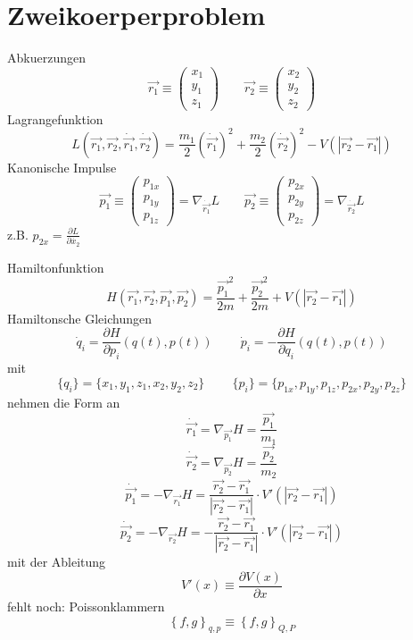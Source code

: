 \documentclass[11pt]{article} %
\begin{document}
\setlength{\parindent}{0ex}


\section{Zweikoerperproblem}

Abkuerzungen
\begin{equation}
\vec{r_1} \equiv \begin{pmatrix} x_1 \\ y_1 \\ z_1 \end{pmatrix}  \quad \quad 
\vec{r_2} \equiv \begin{pmatrix} x_2 \\ y_2 \\ z_2 \end{pmatrix}
\end{equation}
Lagrangefunktion
\[
L(\vec{r_1},\vec{r_2},\dot{\vec{r_1}},\dot{\vec{r_2}}) = 
\frac{m_1}{2}(\dot{\vec{r_1}})^2 +  \frac{m_2}{2}(\dot{\vec{r_2}})^2
- V(\left| \vec{r_2} - \vec{r_1} \right|)
\]
Kanonische Impulse
\[ 
\vec{p_1} \equiv  \begin{pmatrix} p_{1x} \\ p_{1y} \\ p_{1z} \end{pmatrix} = \nabla _{\dot{\vec{r_1}}} L  \quad \quad
\vec{p_2} \equiv  \begin{pmatrix} p_{2x} \\ p_{2y} \\ p_{2z} \end{pmatrix} = \nabla _{\dot{\vec{r_2}}} L 
\]
\centering
z.B.  $ p_{2x} = \frac{\partial L}{\partial \dot{x_2}} $
\par 
\raggedright
Hamiltonfunktion
\[
H(\vec{r_1},\vec{r_2},\vec{p_1},\vec{p_2}) = 
\frac{\vec{p_1}^2}{2m} +  \frac{\vec{p_2}^2}{2m}
+ V(\left| \vec{r_2} - \vec{r_1} \right|)
\]
Hamiltonsche Gleichungen
\[ 
\dot{q}_{i}= \frac{\partial H}{\partial p_{i}}(q(t),p(t))\ \quad \quad 
\dot{p}_{i}=-\frac{\partial H}{\partial q_{i}}(q(t),p(t)) 
\] 
mit
\[ \{q_i\} = \{ x_1, y_1, z_1, x_2, y_2, z_2 \} \  \quad \quad \{p_i\} = \{ p_{1x}, p_{1y}, p_{1z}, p_{2x}, p_{2y}, p_{2z} \} \]
nehmen die Form an
\[ \dot{\vec{r_1}} = \nabla_{\vec{p_1}} H = \frac{\vec{p_1}}{m_1} \]
\[ \dot{\vec{r_2}} = \nabla_{\vec{p_2}} H = \frac{\vec{p_2}}{m_2} \]
\[ \dot{\vec{p_1}} = - \nabla_{\vec{r_1}} H = \frac{\vec{r_2} - \vec{r_1}}{\left|\vec{r_2} - \vec{r_1}\right|} \cdot V'(\left|\vec{r_2} - \vec{r_1}\right|) \]
\[ \dot{\vec{p_2}} = - \nabla_{\vec{r_2}} H = -  \frac{\vec{r_2} - \vec{r_1}}{\left|\vec{r_2} - \vec{r_1}\right|} \cdot V'(\left|\vec{r_2} - \vec{r_1}\right|) \]
mit der Ableitung
\[ V'(x) \equiv \frac{\partial V(x)}{\partial x} \]
fehlt noch: Poissonklammern
\[
\left\{f,g\right\}_{q,p}\equiv \left\{f,g\right\}_{Q,P}
\]
\end{document}
